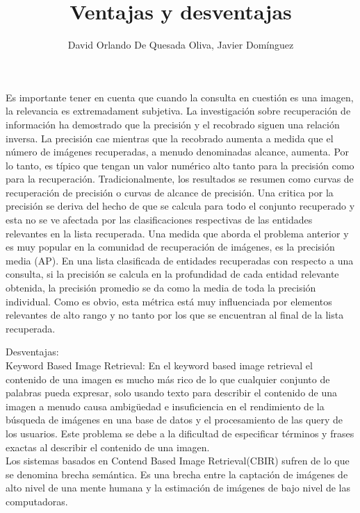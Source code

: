 \documentclass{llncs}
\begin{document}
Es importante tener en cuenta que cuando la consulta en cuestión es una imagen, la relevancia es extremadament subjetiva. 
La investigación sobre recuperación de información ha demostrado que la precisión y el recobrado siguen una relación inversa. 
La precisión cae mientras que la recobrado aumenta a medida que el número de imágenes recuperadas, a menudo denominadas alcance, 
aumenta. Por lo tanto, es típico que tengan un valor numérico alto tanto para la precisión como para la recuperación. 
Tradicionalmente, los resultados se resumen como curvas de recuperación de precisión o curvas de alcance de precisión. 
Una critica por la precisión se deriva del hecho de que se calcula para todo el conjunto recuperado y esta no se ve afectada 
por las clasificaciones respectivas de las entidades relevantes en la lista recuperada. Una medida que aborda el problema 
anterior y es muy popular en la comunidad de recuperación de imágenes, es la precisión media (AP). En una lista clasificada 
de entidades recuperadas con respecto a una consulta, si la precisión se calcula en la profundidad de cada entidad relevante 
obtenida, la precisión promedio se da como la media de toda la precisión individual. Como es obvio, esta métrica está muy 
influenciada por elementos relevantes de alto rango y no tanto por los que se encuentran al final de la lista recuperada.

\newpage

\title{Ventajas y desventajas}
\author{David Orlando De Quesada Oliva, Javier Dom\'inguez}
\maketitle

Desventajas:\\
Keyword Based Image Retrieval:
En el keyword based image retrieval el contenido de una imagen es mucho m\'as rico de lo que cualquier conjunto de palabras pueda 
expresar, solo usando texto para describir el contenido de una imagen a menudo causa ambig\"{u}edad e insuficiencia en el rendimiento
de la b\'usqueda de im\'agenes en una base de datos y el procesamiento de las query de los usuarios. Este problema se debe a la 
dificultad de especificar t\'erminos y frases exactas al describir el contenido de una imagen.
\\
Los sistemas basados en Contend Based Image Retrieval(CBIR) sufren de lo que se denomina brecha sem\'antica. Es una brecha 
entre la captaci\'on de im\'agenes de alto nivel de una mente humana y la estimaci\'on de im\'agenes de bajo nivel de 
las computadoras. 
\end{document}
